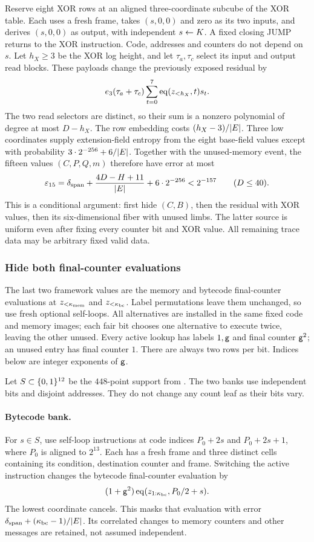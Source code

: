 Reserve eight XOR rows at an aligned three-coordinate subcube of the XOR table. Each uses a fresh frame, takes $(s,0,0)$ and zero as its two inputs, and derives $(s,0,0)$ as output, with independent $s\gets K$. A fixed closing JUMP returns to the XOR instruction. Code, addresses and counters do not depend on $s$. Let $h_X\ge3$ be the XOR log height, and let $\tau_a,\tau_c$ select its input and output read blocks. These payloads change the previously exposed residual by
\[
 e_3(\tau_a+\tau_c)\sum_{t=0}^7\operatorname{eq}(z_{<h_X},t)s_t.
\]
The two read selectors are distinct, so their sum is a nonzero polynomial of degree at most $D-h_X$. The row embedding costs $(h_X-3)/|E|$. Three low coordinates supply extension-field entropy from the eight base-field values except with probability $3\cdot2^{-256}+6/|E|$. Together with the unused-memory event, the fifteen values $(C,P,Q,m)$ therefore have error at most
\[
 \varepsilon_{15}=\delta_{\mathrm{span}}+
 \frac{4D-H+11}{|E|}+6\cdot2^{-256}<2^{-157}\qquad(D\le40).
\]
This is a conditional argument: first hide $(C,B)$, then the residual with XOR values, then its six-dimensional fiber with unused limbs. The latter source is uniform even after fixing every counter bit and XOR value. All remaining trace data may be arbitrary fixed valid data.

\subsubsection{Hide both final-counter evaluations}

The last two framework values are the memory and bytecode final-counter evaluations at $z_{<\kappa_{\mathrm{mem}}}$ and $z_{<\kappa_{\mathrm{bc}}}$. Label permutations leave them unchanged, so use fresh optional self-loops. All alternatives are installed in the same fixed code and memory images; each fair bit chooses one alternative to execute twice, leaving the other unused. Every active lookup has labels $1,\mathsf{g}$ and final counter $\mathsf{g}^2$; an unused entry has final counter $1$. There are always two rows per bit. Indices below are integer exponents of $\mathsf{g}$.

Let $S\subset\{0,1\}^{12}$ be the $448$-point support from . The two banks use independent bits and disjoint addresses. They do not change any count leaf as their bits vary.

\paragraph{Bytecode bank.} For $s\in S$, use self-loop instructions at code indices $P_0+2s$ and $P_0+2s+1$, where $P_0$ is aligned to $2^{13}$. Each has a fresh frame and three distinct cells containing its condition, destination counter and frame. Switching the active instruction changes the bytecode final-counter evaluation by
\[
 (1+\mathsf{g}^2)\operatorname{eq}(z_{1:\kappa_{\mathrm{bc}}},P_0/2+s).
\]
The lowest coordinate cancels. This masks that evaluation with error $\delta_{\mathrm{span}}+(\kappa_{\mathrm{bc}}-1)/|E|$. Its correlated changes to memory counters and other messages are retained, not assumed independent.

